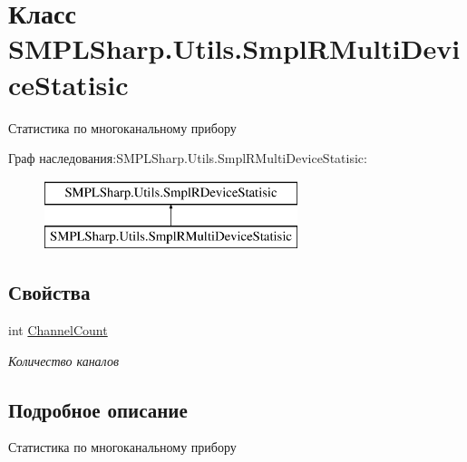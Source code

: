 \hypertarget{class_s_m_p_l_sharp_1_1_utils_1_1_smpl_r_multi_device_statisic}{\section{Класс S\-M\-P\-L\-Sharp.\-Utils.\-Smpl\-R\-Multi\-Device\-Statisic}
\label{de/d2e/class_s_m_p_l_sharp_1_1_utils_1_1_smpl_r_multi_device_statisic}
}


Статистика по многоканальному прибору  


Граф наследования\-:S\-M\-P\-L\-Sharp.\-Utils.\-Smpl\-R\-Multi\-Device\-Statisic\-:\begin{figure}[H]
\begin{center}
\leavevmode
\includegraphics[height=2.000000cm]{de/d2e/class_s_m_p_l_sharp_1_1_utils_1_1_smpl_r_multi_device_statisic}
\end{center}
\end{figure}
\subsection*{Свойства}
\begin{DoxyCompactItemize}
\item 
int \hyperlink{class_s_m_p_l_sharp_1_1_utils_1_1_smpl_r_multi_device_statisic_a918293b0514cc2084174138c94f3a56c}{Channel\-Count}
\begin{DoxyCompactList}\small\item\em Количество каналов \end{DoxyCompactList}\end{DoxyCompactItemize}


\subsection{Подробное описание}
Статистика по многоканальному прибору 



